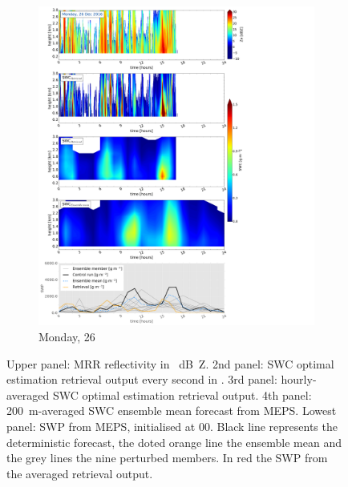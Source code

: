 \begin{figure}\ContinuedFloat
	\centering
	\begin{subfigure}[b]{0.8\textwidth}
		\includegraphics[trim={0.5cm 0.5cm 17.5cm .5cm},clip,width=\textwidth]{./fig_SWC/20161226}
		\caption{Monday, \SI{26}{\dec}}\label{fig:SWC26}
	\end{subfigure}
	\caption{Upper panel: MRR reflectivity in \SI{}{\dB Z}. 2nd panel: SWC optimal estimation retrieval output every second in \SI{}{\SWC}. 3rd panel: hourly-averaged SWC optimal estimation retrieval output. 4th panel: \SI{200}{\metre}-averaged SWC ensemble mean forecast from MEPS. Lowest panel: SWP from MEPS, initialised at \SI{00}{\UTC}. Black line represents the deterministic forecast, the doted orange line the ensemble mean and the grey lines the nine perturbed members. In red the SWP from the averaged retrieval output.}\label{fig:SWC}
\end{figure}

